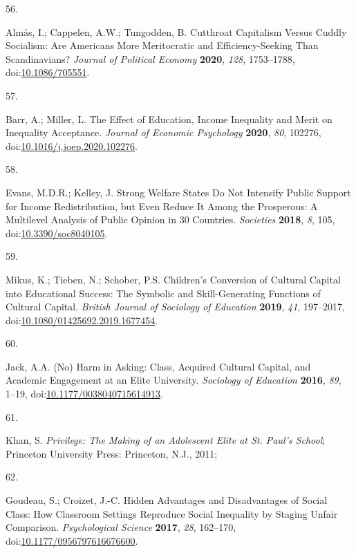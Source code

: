 \documentclass[
  12pt,
  letterpaper,
]{article}
\newlength{\cslhangindent}
\newlength{\csllabelwidth}
\newenvironment{CSLReferences}[2] %
 {\begin{list}{}{%
  \setlength{\itemindent}{0pt}
  \setlength{\leftmargin}{0pt}
  \setlength{\parsep}{0pt}
  \ifodd #1
   \setlength{\leftmargin}{\cslhangindent}
   \setlength{\itemindent}{-1\cslhangindent}
  \fi
  \setlength{\itemsep}{#2\baselineskip}}}
 {\end{list}}
\newcommand{\CSLLeftMargin}[1]{\parbox[t]{\csllabelwidth}{\strut#1\strut}}
\newcommand{\CSLRightInline}[1]{\parbox[t]{\linewidth - \csllabelwidth}{\strut#1\strut}}
\begin{document}
\begin{CSLReferences}{0}{0}
\CSLLeftMargin{56. }%
\CSLRightInline{Almås, I.; Cappelen, A.W.; Tungodden, B. Cutthroat
{Capitalism} Versus {Cuddly Socialism}: {Are Americans More
Meritocratic} and {Efficiency-Seeking} Than {Scandinavians}?
\emph{Journal of Political Economy} \textbf{2020}, \emph{128},
1753--1788, doi:\href{https://doi.org/10.1086/705551}{10.1086/705551}.}

\CSLLeftMargin{57. }%
\CSLRightInline{Barr, A.; Miller, L. The Effect of Education, Income
Inequality and Merit on Inequality Acceptance. \emph{Journal of Economic
Psychology} \textbf{2020}, \emph{80}, 102276,
doi:\href{https://doi.org/10.1016/j.joep.2020.102276}{10.1016/j.joep.2020.102276}.}

\CSLLeftMargin{58. }%
\CSLRightInline{Evans, M.D.R.; Kelley, J. Strong {Welfare States Do Not
Intensify Public Support} for {Income Redistribution}, but {Even Reduce
It} Among the {Prosperous}: {A Multilevel Analysis} of {Public Opinion}
in 30 {Countries}. \emph{Societies} \textbf{2018}, \emph{8}, 105,
doi:\href{https://doi.org/10.3390/soc8040105}{10.3390/soc8040105}.}

\CSLLeftMargin{59. }%
\CSLRightInline{Mikus, K.; Tieben, N.; Schober, P.S. Children's
Conversion of Cultural Capital into Educational Success: The Symbolic
and Skill-Generating Functions of Cultural Capital. \emph{British
Journal of Sociology of Education} \textbf{2019}, \emph{41}, 197--2017,
doi:\href{https://doi.org/10.1080/01425692.2019.1677454}{10.1080/01425692.2019.1677454}.}

\CSLLeftMargin{60. }%
\CSLRightInline{Jack, A.A. ({No}) {Harm} in {Asking}: {Class}, {Acquired
Cultural Capital}, and {Academic Engagement} at an {Elite University}.
\emph{Sociology of Education} \textbf{2016}, \emph{89}, 1--19,
doi:\href{https://doi.org/10.1177/0038040715614913}{10.1177/0038040715614913}.}

\CSLLeftMargin{61. }%
\CSLRightInline{Khan, S. \emph{Privilege: {The Making} of an {Adolescent
Elite} at {St}. {Paul}'s {School}}; Princeton University Press:
Princeton, N.J., 2011;}

\CSLLeftMargin{62. }%
\CSLRightInline{Goudeau, S.; Croizet, J.-C. Hidden {Advantages} and
{Disadvantages} of {Social Class}: {How Classroom Settings Reproduce
Social Inequality} by {Staging Unfair Comparison}. \emph{Psychological
Science} \textbf{2017}, \emph{28}, 162--170,
doi:\href{https://doi.org/10.1177/0956797616676600}{10.1177/0956797616676600}.}


\end{CSLReferences}
\end{document}
